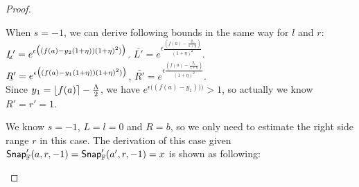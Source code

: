 \documentclass[a4paper,11pt]{article}
\begin{document}
\begin{proof}
\begin{itemize}
		When $s = -1$, we can derive following bounds in the same way for $l$ and $r$:\\
		$\ubar{L'} = e^{\epsilon 
				\big( (f(a) - y_2(1 + \eta)) (1 + \eta)^2) \big)}$.
		$\bar{L'} = e^{\epsilon 
				\frac{(f(a) - \frac{y_2}{1 + \eta})}{(1 + \eta)^2}}$.\\
		$\ubar{R'} = e^{\epsilon 
				\big( (f(a) - y_1(1 + \eta)) (1 + \eta)^2) \big)}$, 
		$\bar{R'} = e^{\epsilon 
				\frac{(f(a) - \frac{y_1}{1 + \eta})}{(1 + \eta)^2}}$.\\
		Since $y_1 = \lfloor f(a) \rceil - \frac{\Lambda}{2}$, 
		we have $e^{\epsilon \big( (f(a) - y_1)) \big)} > 1$, so actually we know $R' = r' = 1$.





		We know $s = -1$, $L = l = 0$ and $R = b$, so we only need to estimate the right side range $r$ in this case. The derivation of this case given $\mathsf{Snap}_{\mathbb{F}}'(a, r, -1) = \mathsf{Snap}_{\mathbb{F}}'(a', r, -1) = x$ is shown as following:

	\end{itemize}



\end{proof}


\newpage


\end{document}
